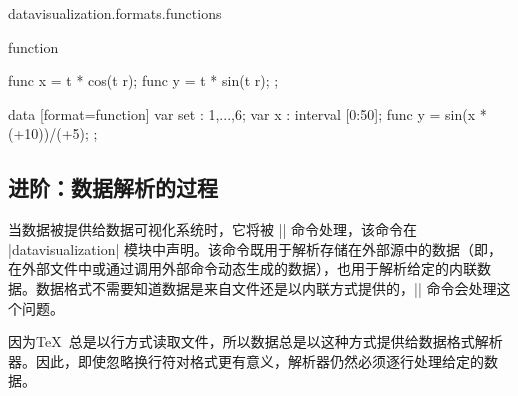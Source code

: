 \begin{tikzlibrary}{datavisualization.formats.functions}
\begin{dataformat}{function}
\begin{codeexample}[
    width=6cm,
    preamble={\usetikzlibrary{datavisualization.formats.functions}},
]
{  func x = \value t * cos(\value t r);
  func y = \value t * sin(\value t r);
};
\end{codeexample}
\begin{codeexample}[
    width=7cm,
    preamble={\usetikzlibrary{datavisualization.formats.functions}},
]
\tikz \datavisualization [
  scientific axes=clean,
  y axis={ticks={style={
        /pgf/number format/fixed,
        /pgf/number format/fixed zerofill,
        /pgf/number format/precision=2}}},
  x axis={ticks={tick suffix=${}^\circ$}},
  visualize as smooth line/.list={1,2,3,4,5,6},
  style sheet=vary hue]
data [format=function] {
  var set : {1,...,6};
  var x : interval [0:50];
  func y = sin(\value x * (\value{set}+10))/(\value{set}+5);
};
\end{codeexample}
    \end{dataformat}
\end{tikzlibrary}


\subsection{进阶：数据解析的过程}
\label{section-dv-parsing}


当数据被提供给数据可视化系统时，它将被 |\pgfdata| 命令处理，该命令在 |datavisualization| 模块中声明。该命令既用于解析存储在外部源中的数据（即，在外部文件中或通过调用外部命令动态生成的数据），也用于解析给定的内联数据。数据格式不需要知道数据是来自文件还是以内联方式提供的，|\pgfdata| 命令会处理这个问题。


因为\TeX\ 总是以行方式读取文件，所以数据总是以这种方式提供给数据格式解析器。因此，即使忽略换行符对格式更有意义，解析器仍然必须逐行处理给定的数据。

